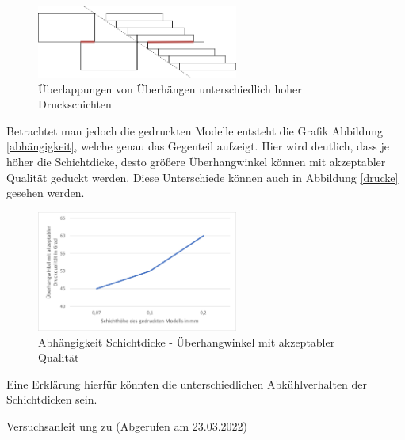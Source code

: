 \documentclass[a4paper,12pt,bibtotocnumbered]{scrartcl}
\numberwithin{equation}{section} %
\begin{document}
\begin{figure}[H]
	\centerline{\includegraphics[width=250px]{./images/layerheights.drawio.png}}
	\caption{Überlappungen von Überhängen unterschiedlich hoher Druckschichten}
	\label{schaubild}
	\end{figure}

Betrachtet man jedoch die gedruckten Modelle entsteht die Grafik Abbildung \ref*{abhängigkeit}, welche genau das Gegenteil aufzeigt. Hier wird deutlich, dass je höher die Schichtdicke, desto größere Überhangwinkel können mit akzeptabler Qualität geduckt werden. Diese Unterschiede können auch in Abbildung \ref*{drucke} gesehen werden.

\begin{figure}[H]
	\centerline{\includegraphics[width=250px]{./images/diagramm.png}}
	\caption{Abhängigkeit Schichtdicke - Überhangwinkel mit akzeptabler Qualität}
	\label{diagramm}
	\end{figure}

Eine Erklärung hierfür könnten die unterschiedlichen Abkühlverhalten der Schichtdicken sein.

\newpage
\begin{thebibliography}{999}
 Versuchsanleit ung zu (Abgerufen am 23.03.2022) 
\end{thebibliography}


%
\end{document}
